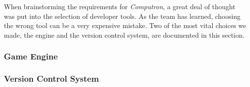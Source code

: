 When brainstorming the requirements for \textit{Computron}, a great 
deal of thought was put into the selection of developer tools. As the 
team has learned, choosing the wrong tool can be a very expensive 
mistake. Two of the most vital choices we made, the engine and the 
version control system, are documented in this section.

\subsubsection{Game Engine} \label{game_engine}


\subsubsection{Version Control System}

